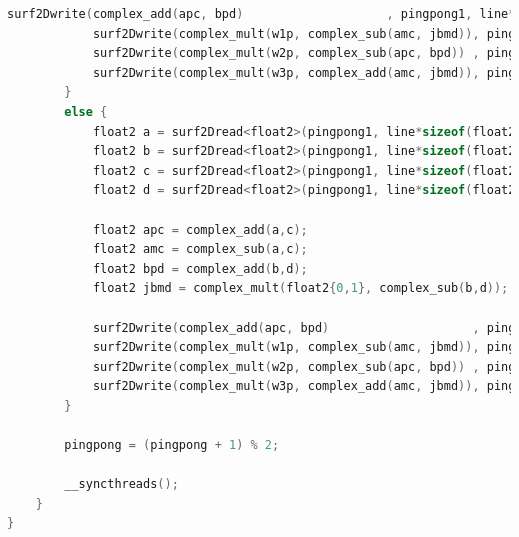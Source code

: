 \documentclass[
  oneside,
  11pt, a4paper,
  footinclude=true,
  headinclude=true,
  cleardoublepage=empty
]{scrbook}
\begin{document}
\begin{lstlisting}[language=C++,caption={FFT Radix-4 Stockham, see \autoref{sec:implementation-analysis-in-cuda}},label={lst:cuda-radix2-stockham}]
            surf2Dwrite(complex_add(apc, bpd)                    , pingpong1, line*sizeof(float2), q + s*(4*p + 0));
            surf2Dwrite(complex_mult(w1p, complex_sub(amc, jbmd)), pingpong1, line*sizeof(float2), q + s*(4*p + 1));
            surf2Dwrite(complex_mult(w2p, complex_sub(apc, bpd)) , pingpong1, line*sizeof(float2), q + s*(4*p + 2));
            surf2Dwrite(complex_mult(w3p, complex_add(amc, jbmd)), pingpong1, line*sizeof(float2), q + s*(4*p + 3));
        }
        else {
            float2 a = surf2Dread<float2>(pingpong1, line*sizeof(float2), q + s*(p + n0));
            float2 b = surf2Dread<float2>(pingpong1, line*sizeof(float2), q + s*(p + n1));
            float2 c = surf2Dread<float2>(pingpong1, line*sizeof(float2), q + s*(p + n2));
            float2 d = surf2Dread<float2>(pingpong1, line*sizeof(float2), q + s*(p + n3));

            float2 apc = complex_add(a,c);
            float2 amc = complex_sub(a,c);
            float2 bpd = complex_add(b,d);
            float2 jbmd = complex_mult(float2{0,1}, complex_sub(b,d));

            surf2Dwrite(complex_add(apc, bpd)                    , pingpong0, line*sizeof(float2), q + s*(4*p + 0));
            surf2Dwrite(complex_mult(w1p, complex_sub(amc, jbmd)), pingpong0, line*sizeof(float2), q + s*(4*p + 1));
            surf2Dwrite(complex_mult(w2p, complex_sub(apc, bpd)) , pingpong0, line*sizeof(float2), q + s*(4*p + 2));
            surf2Dwrite(complex_mult(w3p, complex_add(amc, jbmd)), pingpong0, line*sizeof(float2), q + s*(4*p + 3));
        }

        pingpong = (pingpong + 1) % 2;

        __syncthreads();
    }
}
\end{lstlisting}




\end{document}

